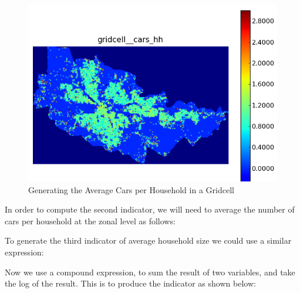 \begin{figure}[htp]
\begin{center}
\includegraphics[scale=0.4]{graphics/indicator-cars-gridcell-2.png}
\end{center}
\caption{Generating the Average Cars per Household in a Gridcell}
\label{fig:indicator-cars-gridcell-2}
\end{figure}

In order to compute the second indicator, we will need to average the
number of cars per household at the zonal level as follows:


% 

To generate the third indicator of average household size we could use
a similar expression:


Now we use a compound expression, to sum the result of two variables,
and take the log of the result.  This is to produce the indicator as
shown below:

